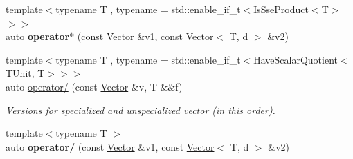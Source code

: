 \begin{DoxyCompactItemize}
\item 
\hypertarget{classVector_3_01TUnit_00_01d_00_01std_1_1enable__if__t_3_01IsFloatSpecialization_3_01TUnit_00_01d_01_4_01_4_01_4_ae0327ce67bfbacc8e20970e5fe0319d6}{}\label{classVector_3_01TUnit_00_01d_00_01std_1_1enable__if__t_3_01IsFloatSpecialization_3_01TUnit_00_01d_01_4_01_4_01_4_ae0327ce67bfbacc8e20970e5fe0319d6} 
{\footnotesize template$<$typename T , typename  = std\+::enable\+\_\+if\+\_\+t$<$\+Is\+Sse\+Product$<$\+T$>$$>$$>$ }\\auto {\bfseries operator$\ast$} (const \hyperlink{classVector}{Vector} \&v1, const \hyperlink{classVector}{Vector}$<$ T, d $>$ \&v2)
\item 
\hypertarget{classVector_3_01TUnit_00_01d_00_01std_1_1enable__if__t_3_01IsFloatSpecialization_3_01TUnit_00_01d_01_4_01_4_01_4_ae14be8b9680fe0ac7dbb53c816b78a77}{}\label{classVector_3_01TUnit_00_01d_00_01std_1_1enable__if__t_3_01IsFloatSpecialization_3_01TUnit_00_01d_01_4_01_4_01_4_ae14be8b9680fe0ac7dbb53c816b78a77} 
{\footnotesize template$<$typename T , typename  = std\+::enable\+\_\+if\+\_\+t$<$\+Have\+Scalar\+Quotient$<$\+T\+Unit, T$>$$>$$>$ }\\auto \hyperlink{classVector_3_01TUnit_00_01d_00_01std_1_1enable__if__t_3_01IsFloatSpecialization_3_01TUnit_00_01d_01_4_01_4_01_4_ae14be8b9680fe0ac7dbb53c816b78a77}{operator/} (const \hyperlink{classVector}{Vector} \&v, T \&\&f)
\begin{DoxyCompactList}\small\item\em Versions for specialized and unspecialized vector (in this order). \end{DoxyCompactList}\item 
\hypertarget{classVector_3_01TUnit_00_01d_00_01std_1_1enable__if__t_3_01IsFloatSpecialization_3_01TUnit_00_01d_01_4_01_4_01_4_ad1deb5d9f0e5397c20e11f64c6d6c26d}{}\label{classVector_3_01TUnit_00_01d_00_01std_1_1enable__if__t_3_01IsFloatSpecialization_3_01TUnit_00_01d_01_4_01_4_01_4_ad1deb5d9f0e5397c20e11f64c6d6c26d} 
{\footnotesize template$<$typename T $>$ }\\auto {\bfseries operator/} (const \hyperlink{classVector}{Vector} \&v1, const \hyperlink{classVector}{Vector}$<$ T, d $>$ \&v2)
\item 
\hypertarget{classVector_3_01TUnit_00_01d_00_01std_1_1enable__if__t_3_01IsFloatSpecialization_3_01TUnit_00_01d_01_4_01_4_01_4_a7910afb9c9dbb82f155e980c6eba1538}{}\label{classVector_3_01TUnit_00_01d_00_01std_1_1enable__if__t_3_01IsFloatSpecialization_3_01TUnit_00_01d_01_4_01_4_01_4_a7910afb9c9dbb82f155e980c6eba1538} 

\end{DoxyCompactItemize}
